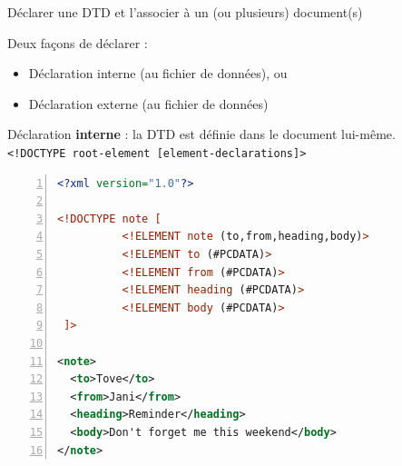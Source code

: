\begin{frame}{Déclarer une DTD et l'associer à un (ou plusieurs) document(s)}

Deux fa\c{c}ons de déclarer :
\begin{itemize}
\item Déclaration interne (au fichier de données), ou
\item Déclaration externe (au fichier de données)
\end{itemize}

\framebreak

Déclaration \textbf{interne} : 
la DTD est définie dans le document lui-même.\\
\verb?<!DOCTYPE root-element [element-declarations]>?

\begin{lstlisting}[basicstyle=\footnotesize, language=XML,breaklines=true,numbers=left, caption={Déclaration interne de DTD}]
<?xml version="1.0"?>

<!DOCTYPE note [
          <!ELEMENT note (to,from,heading,body)>
          <!ELEMENT to (#PCDATA)>
          <!ELEMENT from (#PCDATA)>
          <!ELEMENT heading (#PCDATA)>
          <!ELEMENT body (#PCDATA)>
 ]>

<note>
  <to>Tove</to>
  <from>Jani</from>
  <heading>Reminder</heading>
  <body>Don't forget me this weekend</body>
</note>
\end{lstlisting}

\end{frame}


